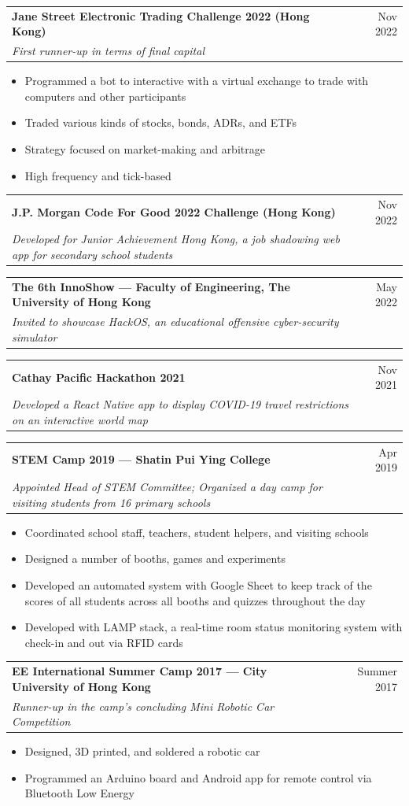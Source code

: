 \documentclass{article}
\newcommand{\jobTitle}[3]{
\vspace{0.4cm}
\begin{tabularx}{0.99\linewidth}{ X r }
    \textbf{#1} & #2\\
    \textit{#3} &
\end{tabularx}
\vspace{0.2cm}
}
\newenvironment{descitemize}
{ \begin{itemize}[leftmargin=1.4cm,,topsep=0pt]
    \setlength{\parskip}{0pt}
    \setlength{\parsep}{0pt}     }
{ \end{itemize}                  }
\begin{document}
\jobTitle
{Jane Street Electronic Trading Challenge 2022 (Hong Kong)}
{Nov 2022}
{First runner-up in terms of final capital}
\begin{descitemize}
    \item Programmed a bot to interactive with a virtual exchange to trade with computers and other participants
    \item Traded various kinds of stocks, bonds, ADRs, and ETFs
    \item Strategy focused on market-making and arbitrage
    \item High frequency and tick-based
\end{descitemize}

\jobTitle
{J.P. Morgan Code For Good 2022 Challenge (Hong Kong)}
{Nov 2022}
{Developed for Junior Achievement Hong Kong, a job shadowing web app for secondary school students}

\jobTitle
{The 6th InnoShow --- Faculty of Engineering, The University of Hong Kong}
{May 2022}
{Invited to showcase HackOS, an educational offensive cyber-security simulator}

\jobTitle
{Cathay Pacific Hackathon 2021}
{Nov 2021}
{Developed a React Native app to display COVID-19 travel restrictions on an interactive world map}

\jobTitle
{STEM Camp 2019 --- Shatin Pui Ying College}
{Apr 2019}
{Appointed Head of STEM Committee; Organized a day camp for visiting students from 16 primary schools}
\begin{descitemize}
    \item Coordinated school staff, teachers, student helpers, and visiting schools
    \item Designed a number of booths, games and experiments
    \item Developed an automated system with Google Sheet to keep track of the scores of all students across all booths and quizzes throughout the day
    \item Developed with LAMP stack, a real-time room status monitoring system with check-in and out via RFID cards
\end{descitemize}

\jobTitle
{EE International Summer Camp 2017 --- City University of Hong Kong}
{Summer 2017}
{Runner-up in the camp's concluding Mini Robotic Car Competition}
\begin{descitemize}
    \item Designed, 3D printed, and soldered a robotic car
    \item Programmed an Arduino board and Android app for remote control via Bluetooth Low Energy
\end{descitemize}
\end{document}
